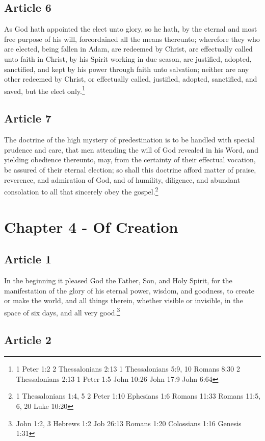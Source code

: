 \documentclass[12pt,letterpaper]{book}
\begin{document}
\section{Article 6}

As God hath appointed the elect unto glory, so he hath, by the eternal and most free purpose of his will, foreordained all the means thereunto; wherefore they who are elected, being fallen in Adam, are redeemed by Christ, are effectually called unto faith in Christ, by his Spirit working in due season, are justified, adopted, sanctified, and kept by his power through faith unto salvation; neither are any other redeemed by Christ, or effectually called, justified, adopted, sanctified, and saved, but the elect only.\footnote{1 Peter 1:2 2 Thessalonians 2:13 1 Thessalonians 5:9, 10 Romans 8:30 2 Thessalonians 2:13 1 Peter 1:5 John 10:26 John 17:9 John 6:64}

\section{Article 7}

The doctrine of the high mystery of predestination is to be handled with special prudence and care, that men attending the will of God revealed in his Word, and yielding obedience thereunto, may, from the certainty of their effectual vocation, be assured of their eternal election; so shall this doctrine afford matter of praise, reverence, and admiration of God, and of humility, diligence, and abundant consolation to all that sincerely obey the gospel.\footnote{1 Thessalonians 1:4, 5 2 Peter 1:10 Ephesians 1:6 Romans 11:33 Romans 11:5, 6, 20 Luke 10:20}

\chapter{Chapter 4 - Of Creation}
\section{Article 1}

In the beginning it pleased God the Father, Son, and Holy Spirit, for the manifestation of the glory of his eternal power, wisdom, and goodness, to create or make the world, and all things therein, whether visible or invisible, in the space of six days, and all very good.\footnote{John 1:2, 3 Hebrews 1:2 Job 26:13 Romans 1:20 Colossians 1:16 Genesis 1:31}

\section{Article 2}
\end{document}
